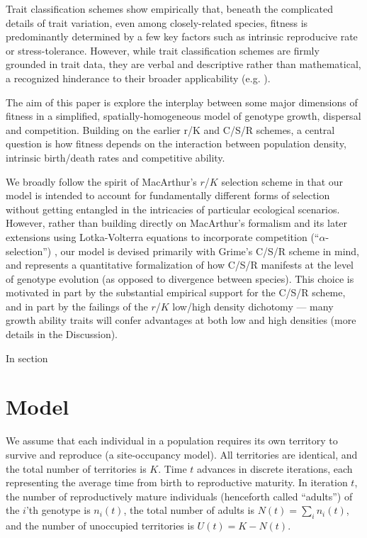 \documentclass[11pt]{article}
\begin{document}
Trait classification schemes show empirically that, beneath the complicated details of trait variation, even among closely-related species, fitness is predominantly determined by a few key factors such as intrinsic reproducive rate or stress-tolerance. However, while trait classification schemes are firmly grounded in trait data, they are verbal and descriptive rather than mathematical, a recognized hinderance to their broader applicability (e.g. \citep{tilman_2007}). 

The aim of this paper is explore the interplay between some major dimensions of fitness in a simplified, spatially-homogeneous model of genotype growth, dispersal and competition. Building on the earlier r/K and C/S/R schemes, a central question is how fitness depends on the interaction between population density, intrinsic birth/death rates and competitive ability. 

We broadly follow the spirit of MacArthur's $r$/$K$ selection scheme in that our model is intended to account for fundamentally different forms of selection without getting  entangled in the intricacies of particular ecological scenarios. However, rather than building directly on MacArthur's formalism and its later extensions using Lotka-Volterra equations to incorporate competition (``$\alpha$-selection'') \citep{gill_1974,case_1974,joshi_2001}, our model is devised primarily with Grime's C/S/R scheme in mind, and represents a quantitative formalization of how C/S/R manifests at the level of genotype evolution (as opposed to divergence between species). This choice is motivated in part by the substantial empirical support for the C/S/R scheme, and in part by the failings of the $r$/$K$ low/high density dichotomy --- many growth ability traits will confer advantages at both low and high densities (more details in the Discussion). 

In section
 

\section*{Model}\label{sec:model}

We assume that each individual in a population requires its own territory to survive and reproduce (a site-occupancy model). All territories are identical, and the total number of territories is $K$. Time $t$ advances in discrete iterations, each representing the average time from birth to reproductive maturity. In iteration $t$, the number of reproductively mature individuals (henceforth called ``adults'') of the $i$'th genotype is $n_i(t)$, the total number of adults is $N(t)=\sum_i n_i(t)$, and the number of unoccupied territories is $U(t)=K-N(t)$. 
\end{document}
